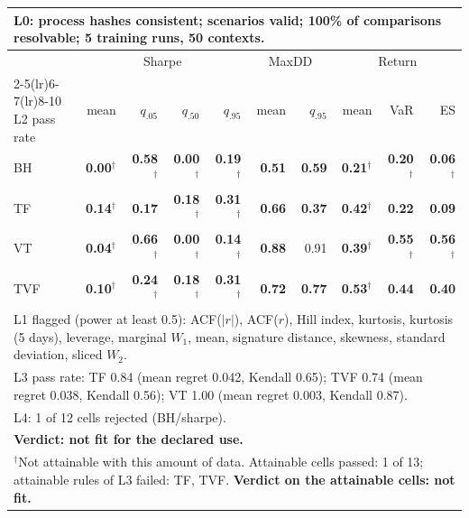 \begin{tabular}{lrrrrrrrrr}
\toprule
\multicolumn{10}{p{13.5cm}}{L0: process hashes consistent; scenarios valid; 100\% of comparisons resolvable; 5 training runs, 50 contexts.} \\
\midrule
 & \multicolumn{4}{c}{Sharpe} & \multicolumn{2}{c}{MaxDD} & \multicolumn{3}{c}{Return} \\
\cmidrule(lr){2-5}\cmidrule(lr){6-7}\cmidrule(lr){8-10}
L2 pass rate & mean & $q_{.05}$ & $q_{.50}$ & $q_{.95}$ & mean & $q_{.95}$ & mean & VaR & ES \\
\midrule
BH & \textbf{0.00}$^{\dagger}$ & \textbf{0.58}$^{\dagger}$ & \textbf{0.00}$^{\dagger}$ & \textbf{0.19}$^{\dagger}$ & \textbf{0.51} & \textbf{0.59} & \textbf{0.21}$^{\dagger}$ & \textbf{0.20}$^{\dagger}$ & \textbf{0.06}$^{\dagger}$ \\
TF & \textbf{0.14}$^{\dagger}$ & \textbf{0.17} & \textbf{0.18}$^{\dagger}$ & \textbf{0.31}$^{\dagger}$ & \textbf{0.66} & \textbf{0.37} & \textbf{0.42}$^{\dagger}$ & \textbf{0.22} & \textbf{0.09} \\
VT & \textbf{0.04}$^{\dagger}$ & \textbf{0.66}$^{\dagger}$ & \textbf{0.00}$^{\dagger}$ & \textbf{0.14}$^{\dagger}$ & \textbf{0.88} & 0.91 & \textbf{0.39}$^{\dagger}$ & \textbf{0.55}$^{\dagger}$ & \textbf{0.56}$^{\dagger}$ \\
TVF & \textbf{0.10}$^{\dagger}$ & \textbf{0.24}$^{\dagger}$ & \textbf{0.18}$^{\dagger}$ & \textbf{0.31}$^{\dagger}$ & \textbf{0.72} & \textbf{0.77} & \textbf{0.53}$^{\dagger}$ & \textbf{0.44} & \textbf{0.40} \\
\midrule
\multicolumn{10}{p{13.5cm}}{L1 flagged (power at least 0.5): ACF($|r|$), ACF($r$), Hill index, kurtosis, kurtosis (5 days), leverage, marginal $W_1$, mean, signature distance, skewness, standard deviation, sliced $W_2$.} \\
\multicolumn{10}{p{13.5cm}}{L3 pass rate: TF 0.84 (mean regret 0.042, Kendall 0.65); TVF 0.74 (mean regret 0.038, Kendall 0.56); VT 1.00 (mean regret 0.003, Kendall 0.87).} \\
\multicolumn{10}{p{13.5cm}}{L4: 1 of 12 cells rejected (BH/sharpe).} \\
\multicolumn{10}{p{13.5cm}}{\textbf{Verdict: not fit for the declared use.}} \\
\multicolumn{10}{p{13.5cm}}{$^{\dagger}$Not attainable with this amount of data. Attainable cells passed: 1 of 13; attainable rules of L3 failed: TF, TVF. \textbf{Verdict on the attainable cells: not fit.}} \\
\bottomrule
\end{tabular}
